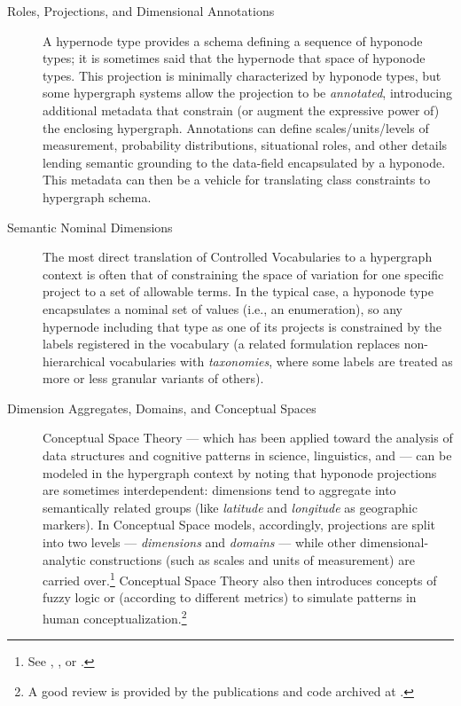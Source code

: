 {\begin{description}
\item[Roles, Projections, and Dimensional Annotations]
A hypernode type provides a schema defining a 
sequence of hyponode types; it is sometimes 
said that the hypernode  that 
space of hyponode types.  This projection is 
minimally characterized by hyponode types, 
but some hypergraph systems allow the 
projection to be \textit{annotated}, introducing 
additional metadata that constrain 
(or augment the expressive power of) the 
enclosing hypergraph.  Annotations can 
define scales/units/levels of measurement, 
probability distributions, situational roles, 
and other details lending semantic grounding 
to the data-field encapsulated by a hyponode.  
This metadata can then be a vehicle for 
translating \RDF{} class constraints to 
hypergraph schema. 

\item[Semantic Nominal Dimensions]
The most direct translation of 
Controlled Vocabularies to a hypergraph context 
is often that of constraining the space 
of variation for one specific project to 
a set of allowable terms.  In the typical 
case, a hyponode type encapsulates a 
nominal set of values (i.e., an enumeration), 
so any hypernode including that type as one 
of its projects is constrained by the 
labels registered in the vocabulary 
(a related formulation replaces 
non-hierarchical vocabularies with 
\textit{taxonomies}, where some labels 
are treated as more or less granular 
variants of others).

\item[Dimension Aggregates, Domains, and Conceptual Spaces]
Conceptual Space Theory --- which has been applied 
toward the analysis of data structures and 
cognitive patterns in science, linguistics, 
and \AI{} --- can be modeled in the 
hypergraph context by noting that hyponode 
projections are sometimes interdependent: 
dimensions tend to aggregate into semantically 
related groups (like \textit{latitude} and 
\textit{longitude} as geographic markers).  
In Conceptual Space models, accordingly, 
projections are split into two 
levels --- \textit{dimensions} and 
\textit{domains} --- while other 
dimensional-analytic constructions 
(such as scales and units of measurement) are 
carried over.\footnote{See , 
, 
or .}  
Conceptual Space Theory also then introduces 
concepts of fuzzy logic or  
(according to different metrics) to simulate 
patterns in human 
conceptualization.\footnote{A good review is 
provided by the publications and code archived 
at .}
  

\end{description}}
